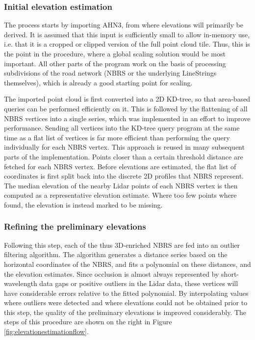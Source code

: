 \subsubsection{Initial elevation estimation}

The process starts by importing AHN3, from where elevations will primarily be derived. It is assumed that this input is sufficiently small to allow in-memory use, i.e. that it is a cropped or clipped version of the full point cloud tile. Thus, this is the point in the procedure, where a global scaling solution would be most important. All other parts of the program work on the basis of processing subdivisions of the road network (NBRS or the underlying LineStrings themselves), which is already a good starting point for scaling.

The imported point cloud is first converted into a 2D KD-tree, so that area-based queries can be performed efficiently on it. This is followed by the flattening of all NBRS vertices into a single series, which was implemented in an effort to improve performance. Sending all vertices into the KD-tree query program at the same time as a flat list of vertices is far more efficient than performing the query individually for each NBRS vertex. This approach is reused in many subsequent parts of the implementation. Points closer than a certain threshold distance are fetched for each NBRS vertex. Before elevations are estimated, the flat list of coordinates is first split back into the discrete 2D profiles that NBRS represent. The median elevation of the nearby Lidar points of each NBRS vertex is then computed as a representative elevation estimate. Where too few points where found, the elevation is instead marked to be missing.

\subsubsection{Refining the preliminary elevations}

Following this step, each of the thus 3D-enriched NBRS are fed into an outlier filtering algorithm. The algorithm generates a distance series based on the horizontal coordinates of the NBRS, and fits a polynomial on these distances, and the elevation estimates. Since occlusion is almost always represented by short-wavelength data gaps or positive outliers in the Lidar data, these vertices will have considerable errors relative to the fitted polynomial. By interpolating values where outliers were detected and where elevations could not be obtained prior to this step, the quality of the preliminary elevations is improved considerably. The steps of this procedure are shown on the right in Figure \ref{fig:elevationestimationflow}.


